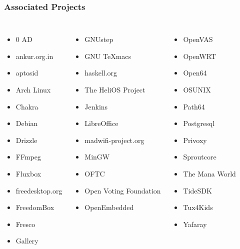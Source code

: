 \documentclass[10pt, compress]{beamer}
\begin{document}
\begin{frame}[fragile]
  \frametitle{Associated Projects}
  \begin{center}
  	\begin{columns}
	  \begin{itemize}
		\item 0 AD
		\item ankur.org.in
		\item aptosid
		\item Arch Linux
		\item Chakra
		\item Debian
		\item Drizzle
		\item FFmpeg
		\item Fluxbox
		\item freedesktop.org
		\item FreedomBox
		\item Fresco
		\item Gallery
	  \end{itemize}
	  \begin{itemize}
		\item GNUstep
		\item GNU TeXmacs
		\item haskell.org
		\item The HeliOS Project
		\item Jenkins
		\item LibreOffice
		\item madwifi-project.org
		\item MinGW
		\item OFTC
		\item Open Voting Foundation
		\item OpenEmbedded
	  \end{itemize}
	  \begin{itemize}
		\item OpenVAS
		\item OpenWRT
		\item Open64
		\item OSUNIX
		\item Path64
		\item Postgresql
		\item Privoxy
		\item Sproutcore
		\item The Mana World
		\item TideSDK
		\item Tux4Kids
		\item Yafaray
	  \end{itemize}
	\end{columns}
  \end{center}
\end{frame}
\end{document}
